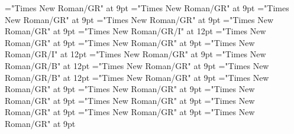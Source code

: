 \documentclass[gps1,twoside]{article}
\begin{document}
\font\spanspanrestrictionssensesensessensesensesentrybefore="Times New Roman/GR" at 9pt
\font\spanrestrictionssensesensessensesensesentryfirstchildbefore="Times New Roman/GR" at 9pt
\font\spanrestrictionssensesensessensesensesentrylastchildafter="Times New Roman/GR" at 9pt
\font\spanspanlexsensereferencessensesensessensesensesentrybefore="Times New Roman/GR" at 9pt
\font\lexsensereferencessensesensessensesensesentryafter="Times New Roman/GR" at 9pt
\font\spanenownertypeabbreviationlexsensereferencelexsensereferencessensesensessensesensesentry="Times New Roman/GR/I" at 12pt
\font\spanspanownertypeabbreviationlexsensereferencelexsensereferencessensesensessensesensesentrybefore="Times New Roman/GR" at 9pt
\font\spanownertypeabbreviationlexsensereferencelexsensereferencessensesensessensesensesentrylastchildafter="Times New Roman/GR" at 9pt
\font\spanownertypeabbreviationlexsensereferencelexsensereferencessensesensessensesensesentry="Times New Roman/GR/I" at 12pt
\font\configtargetconfigtargetconfigtargetslexsensereferencelexsensereferencessensesensessensesensesentrybefore="Times New Roman/GR" at 9pt
\font\spanbzhheadwordconfigtargetconfigtargetslexsensereferencelexsensereferencessensesensessensesensesentry="Times New Roman/GR/B" at 12pt
\font\spanspanheadwordconfigtargetconfigtargetslexsensereferencelexsensereferencessensesensessensesensesentrybefore="Times New Roman/GR" at 9pt
\font\spanheadwordconfigtargetconfigtargetslexsensereferencelexsensereferencessensesensessensesensesentry="Times New Roman/GR/B" at 12pt
\font\variantformentrybackrefvariantformentrybackrefvariantformentrybackrefssensesensessensesensesentrybefore="Times New Roman/GR" at 9pt
\font\variantformentrybackrefssensesensessensesensesentrybefore="Times New Roman/GR" at 9pt
\font\variantformentrybackrefssensesensessensesensesentryafter="Times New Roman/GR" at 9pt
\font\variantentrytypevariantentrytypevariantentrytypesvariantformentrybackrefvariantformentrybackrefssensesensessensesensesentrybefore="Times New Roman/GR" at 9pt
\font\variantentrytypesvariantformentrybackrefvariantformentrybackrefssensesensessensesensesentryafter="Times New Roman/GR" at 9pt
\font\spanspanreverseabbrvariantentrytypevariantentrytypesvariantformentrybackrefvariantformentrybackrefssensesensessensesensesentrybefore="Times New Roman/GR" at 9pt
\font\spanreverseabbrvariantentrytypevariantentrytypesvariantformentrybackrefvariantformentrybackrefssensesensessensesensesentrylastchildafter="Times New Roman/GR" at 9pt
\font\spanspanheadwordvariantformentrybackrefvariantformentrybackrefssensesensessensesensesentrybefore="Times New Roman/GR" at 9pt
\end{document}
